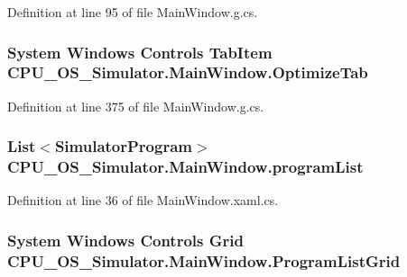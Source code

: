 Definition at line 95 of file Main\+Window.\+g.\+cs.

\hypertarget{class_c_p_u___o_s___simulator_1_1_main_window_a47b1359d9e96abf2b0935eb3392405d4}{}
\subsubsection[{Optimize\+Tab}]{\setlength{\rightskip}{0pt plus 5cm}System Windows Controls Tab\+Item C\+P\+U\+\_\+\+O\+S\+\_\+\+Simulator.\+Main\+Window.\+Optimize\+Tab\hspace{0.3cm}{\ttfamily [package]}}\label{class_c_p_u___o_s___simulator_1_1_main_window_a47b1359d9e96abf2b0935eb3392405d4}


Definition at line 375 of file Main\+Window.\+g.\+cs.

\hypertarget{class_c_p_u___o_s___simulator_1_1_main_window_a48fa4dc074c098338a652dbd6a3434c7}{}
\subsubsection[{program\+List}]{\setlength{\rightskip}{0pt plus 5cm}List$<${\bf Simulator\+Program}$>$ C\+P\+U\+\_\+\+O\+S\+\_\+\+Simulator.\+Main\+Window.\+program\+List\hspace{0.3cm}{\ttfamily [private]}}\label{class_c_p_u___o_s___simulator_1_1_main_window_a48fa4dc074c098338a652dbd6a3434c7}


Definition at line 36 of file Main\+Window.\+xaml.\+cs.

\hypertarget{class_c_p_u___o_s___simulator_1_1_main_window_adb8397cdbc794d18b0379ba7251d2278}{}
\subsubsection[{Program\+List\+Grid}]{\setlength{\rightskip}{0pt plus 5cm}System Windows Controls Grid C\+P\+U\+\_\+\+O\+S\+\_\+\+Simulator.\+Main\+Window.\+Program\+List\+Grid\hspace{0.3cm}{\ttfamily [package]}}\label{class_c_p_u___o_s___simulator_1_1_main_window_adb8397cdbc794d18b0379ba7251d2278}


